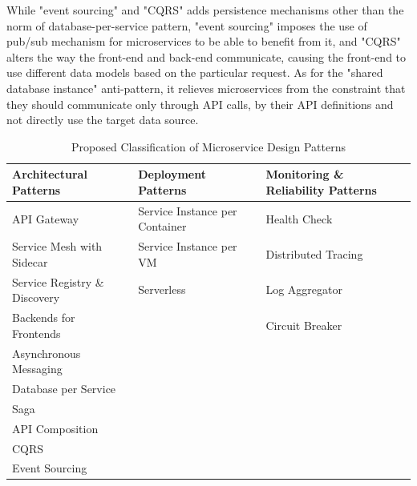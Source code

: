 \documentclass{Configuration_Files/PoliMi3i_thesis}
\begin{document}
While "event sourcing" and "CQRS" adds persistence mechanisms other than the norm of database-per-service pattern, "event sourcing" imposes the use of pub/sub mechanism for microservices to be able to benefit from it, and "CQRS" alters the way the front-end and back-end communicate, causing the front-end to use different data models based on the particular request.
As for the "shared database instance" anti-pattern, it relieves microservices from the constraint that they should communicate only through API calls, by their API definitions and not directly use the target data source.
\\
\begin{table}[H]
\centering 
    \begin{tabular}{ 
  | >{\centering\arraybackslash} m{12em} 
  | >{\centering\arraybackslash} m{12em} 
  | >{\centering\arraybackslash} m{12em} | }
    \hline
    \rowcolor{bluepoli!40}
    \textbf{Architectural Patterns} & \textbf{Deployment Patterns} & \textbf{Monitoring \& Reliability Patterns}\T\B \\
    \hline \hline
    API Gateway & Service Instance per Container & Health Check\T\B\\
    \hline
    \rowcolor{bluepoli!10}
    Service Mesh with Sidecar & Service Instance per VM & Distributed Tracing\T\B\\
    \hline
    Service Registry \& Discovery & Serverless & Log Aggregator\T\B\\
    \hline
    \rowcolor{bluepoli!10}
    Backends for Frontends &  & Circuit Breaker\T\B\\
    \hline
    Asynchronous Messaging & & \T\B\\
    \hline
    \rowcolor{bluepoli!10}
    Database per Service & & \T\B\\
    \hline
    Saga & & \T\B\\
    \hline
    \rowcolor{bluepoli!10}
    API Composition & & \T\B\\
    \hline
    CQRS & & \T\B\\
    \hline
    \rowcolor{bluepoli!10}
    Event Sourcing & & \T\B\\
    \hline
    \end{tabular}
    \\[10pt]
    \caption{Proposed Classification of Microservice Design Patterns}
    \label{table:pattern_table}
\end{table}
\\
\end{document}
